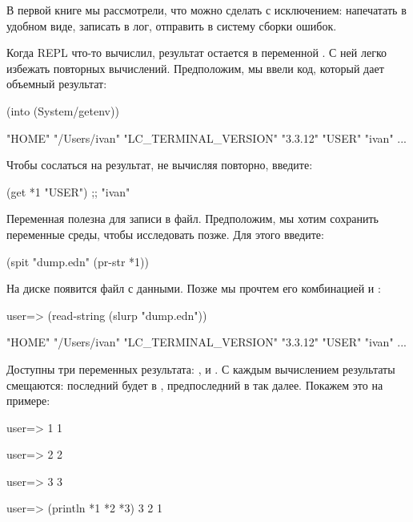 В первой книге мы рассмотрели, что можно сделать с исключением: напечатать в удобном виде, записать в лог, отправить в систему сборки ошибок.

Когда REPL что-то вычислил, результат остается в переменной . С ней легко избежать повторных вычислений. Предположим, мы ввели код, который дает объемный результат:

\begin{english}
  \begin{clojure}
(into {} (System/getenv))

{"HOME" "/Users/ivan"
 "LC_TERMINAL_VERSION" "3.3.12"
 "USER" "ivan"
 ...}
  \end{clojure}
\end{english}

Чтобы сослаться на результат, не вычисляя повторно, введите:

\begin{english}
  \begin{clojure}
(get *1 "USER")
;; "ivan"
  \end{clojure}
\end{english}

Переменная  полезна для записи в файл. Предположим, мы хотим сохранить переменные среды, чтобы исследовать позже. Для этого введите:

\begin{english}
  \begin{clojure}
(spit "dump.edn" (pr-str *1))
  \end{clojure}
\end{english}

На диске появится файл  с данными. Позже мы прочтем его комбинацией  и :

\begin{english}
  \begin{clojure}
user=> (read-string (slurp "dump.edn"))

{"HOME" "/Users/ivan"
 "LC_TERMINAL_VERSION" "3.3.12"
 "USER" "ivan"
 ...}
  \end{clojure}
\end{english}

Доступны три переменных результата: ,  и . С каждым вычислением результаты смещаются: последний будет в , предпоследний в  так далее. Покажем это на примере:

\begin{english}
  \begin{clojure}
user=> 1
1

user=> 2
2

user=> 3
3

user=> (println *1 *2 *3)
3 2 1
  \end{clojure}
\end{english}

